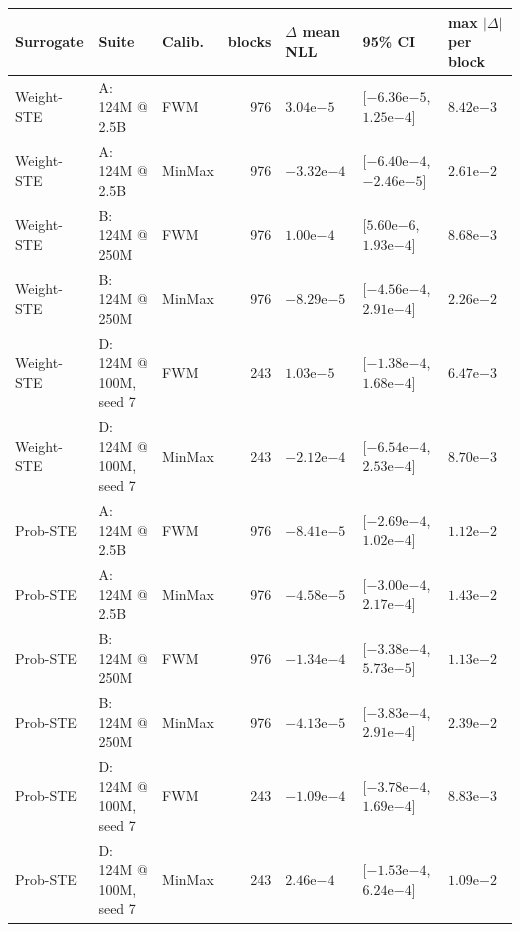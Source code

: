 \begin{tabular}{lllrlll}
\toprule
Surrogate & Suite & Calib. & blocks & $\Delta$ mean NLL & 95\% CI & max $|\Delta|$ per block \\
\midrule
Weight-STE & A: 124M @ 2.5B & FWM & 976 & $3.04\mathrm{e}{-5}$ & [$-6.36\mathrm{e}{-5}$, $1.25\mathrm{e}{-4}$] & $8.42\mathrm{e}{-3}$ \\
Weight-STE & A: 124M @ 2.5B & MinMax & 976 & $-3.32\mathrm{e}{-4}$ & [$-6.40\mathrm{e}{-4}$, $-2.46\mathrm{e}{-5}$] & $2.61\mathrm{e}{-2}$ \\
Weight-STE & B: 124M @ 250M & FWM & 976 & $1.00\mathrm{e}{-4}$ & [$5.60\mathrm{e}{-6}$, $1.93\mathrm{e}{-4}$] & $8.68\mathrm{e}{-3}$ \\
Weight-STE & B: 124M @ 250M & MinMax & 976 & $-8.29\mathrm{e}{-5}$ & [$-4.56\mathrm{e}{-4}$, $2.91\mathrm{e}{-4}$] & $2.26\mathrm{e}{-2}$ \\
Weight-STE & D: 124M @ 100M, seed 7 & FWM & 243 & $1.03\mathrm{e}{-5}$ & [$-1.38\mathrm{e}{-4}$, $1.68\mathrm{e}{-4}$] & $6.47\mathrm{e}{-3}$ \\
Weight-STE & D: 124M @ 100M, seed 7 & MinMax & 243 & $-2.12\mathrm{e}{-4}$ & [$-6.54\mathrm{e}{-4}$, $2.53\mathrm{e}{-4}$] & $8.70\mathrm{e}{-3}$ \\
\midrule
Prob-STE & A: 124M @ 2.5B & FWM & 976 & $-8.41\mathrm{e}{-5}$ & [$-2.69\mathrm{e}{-4}$, $1.02\mathrm{e}{-4}$] & $1.12\mathrm{e}{-2}$ \\
Prob-STE & A: 124M @ 2.5B & MinMax & 976 & $-4.58\mathrm{e}{-5}$ & [$-3.00\mathrm{e}{-4}$, $2.17\mathrm{e}{-4}$] & $1.43\mathrm{e}{-2}$ \\
Prob-STE & B: 124M @ 250M & FWM & 976 & $-1.34\mathrm{e}{-4}$ & [$-3.38\mathrm{e}{-4}$, $5.73\mathrm{e}{-5}$] & $1.13\mathrm{e}{-2}$ \\
Prob-STE & B: 124M @ 250M & MinMax & 976 & $-4.13\mathrm{e}{-5}$ & [$-3.83\mathrm{e}{-4}$, $2.91\mathrm{e}{-4}$] & $2.39\mathrm{e}{-2}$ \\
Prob-STE & D: 124M @ 100M, seed 7 & FWM & 243 & $-1.09\mathrm{e}{-4}$ & [$-3.78\mathrm{e}{-4}$, $1.69\mathrm{e}{-4}$] & $8.83\mathrm{e}{-3}$ \\
Prob-STE & D: 124M @ 100M, seed 7 & MinMax & 243 & $2.46\mathrm{e}{-4}$ & [$-1.53\mathrm{e}{-4}$, $6.24\mathrm{e}{-4}$] & $1.09\mathrm{e}{-2}$ \\
\bottomrule
\end{tabular}
